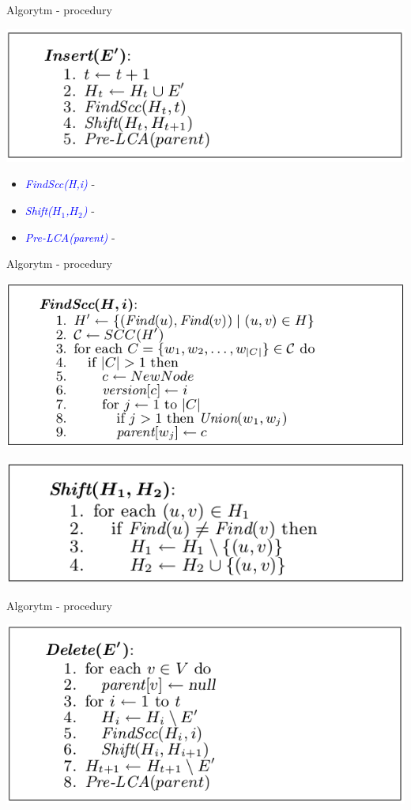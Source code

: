 \documentclass{beamer}
\newcommand{\emp}[1]{\textcolor{blue}{\textit{#1}}}
\begin{document}
\begin{frame}{Algorytm - procedury}
\begin{center}
\includegraphics[scale=0.4]{Insert.png}
\end{center}

\begin{itemize}
\item \emp{FindScc(H,i)} - 
\item \emp{Shift($H_1$,$H_2$)} -
\item \emp{Pre-LCA(parent)} - 
\end{itemize}
\end{frame}

\begin{frame}{Algorytm - procedury}
\begin{center}
\includegraphics[scale=0.4]{FindScc.png}
\end{center}

\begin{center}
\includegraphics[scale=0.4]{Shift.png}
\end{center}
\end{frame}

\begin{frame}{Algorytm - procedury}
\begin{center}
\includegraphics[scale=0.4]{Delete.png}
\end{center}
\end{frame}
\end{document}
